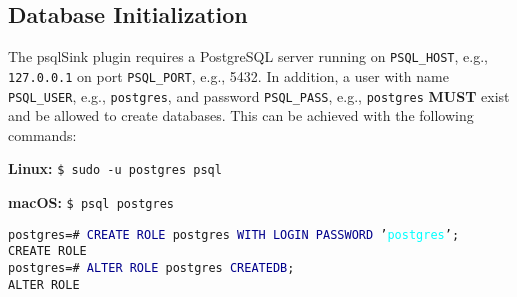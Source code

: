 \documentclass[documentation]{subfiles}
\begin{document}
\subsection{Database Initialization}

The psqlSink plugin requires a PostgreSQL server running on {\tt PSQL\_HOST}, e.g., {\tt 127.0.0.1} on port {\tt PSQL\_PORT}, e.g., 5432.
In addition, a user with name {\tt PSQL\_USER}, e.g., {\tt postgres}, and password {\tt PSQL\_PASS}, e.g., {\tt postgres} {\bf MUST} exist and be allowed to create databases. This can be achieved with the following commands:\\

\begin{minipage}{.48\textwidth}
{\bf Linux:} {\tt \$ sudo -u postgres psql}\\
\end{minipage}
\hfill
\begin{minipage}{.48\textwidth}
{\bf macOS:} {\tt \$ psql postgres}\\
\end{minipage}

\noindent
{\tt postgres=\# \textcolor{darkblue}{CREATE ROLE} postgres \textcolor{darkblue}{WITH LOGIN PASSWORD} '\textcolor{cyan}{postgres}';}\\
{\tt CREATE ROLE}\\
{\tt postgres=\# \textcolor{darkblue}{ALTER ROLE} postgres \textcolor{darkblue}{CREATEDB};}\\
{\tt ALTER ROLE}
\end{document}
